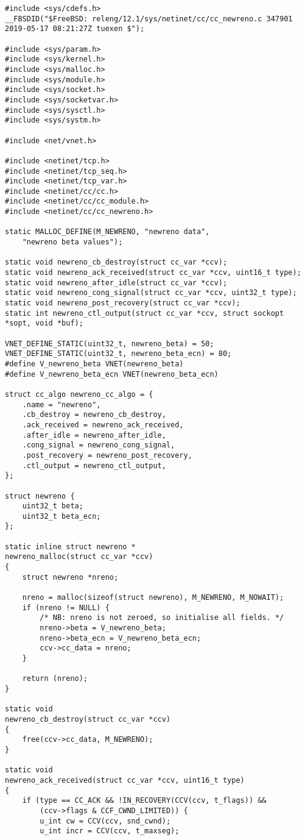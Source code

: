 \begin{code}
\begin{verbatim}
#include <sys/cdefs.h>
__FBSDID("$FreeBSD: releng/12.1/sys/netinet/cc/cc_newreno.c 347901 2019-05-17 08:21:27Z tuexen $");

#include <sys/param.h>
#include <sys/kernel.h>
#include <sys/malloc.h>
#include <sys/module.h>
#include <sys/socket.h>
#include <sys/socketvar.h>
#include <sys/sysctl.h>
#include <sys/systm.h>

#include <net/vnet.h>

#include <netinet/tcp.h>
#include <netinet/tcp_seq.h>
#include <netinet/tcp_var.h>
#include <netinet/cc/cc.h>
#include <netinet/cc/cc_module.h>
#include <netinet/cc/cc_newreno.h>

static MALLOC_DEFINE(M_NEWRENO, "newreno data",
    "newreno beta values");

static void	newreno_cb_destroy(struct cc_var *ccv);
static void	newreno_ack_received(struct cc_var *ccv, uint16_t type);
static void	newreno_after_idle(struct cc_var *ccv);
static void	newreno_cong_signal(struct cc_var *ccv, uint32_t type);
static void	newreno_post_recovery(struct cc_var *ccv);
static int newreno_ctl_output(struct cc_var *ccv, struct sockopt *sopt, void *buf);

VNET_DEFINE_STATIC(uint32_t, newreno_beta) = 50;
VNET_DEFINE_STATIC(uint32_t, newreno_beta_ecn) = 80;
#define V_newreno_beta VNET(newreno_beta)
#define V_newreno_beta_ecn VNET(newreno_beta_ecn)

struct cc_algo newreno_cc_algo = {
    .name = "newreno",
    .cb_destroy = newreno_cb_destroy,
    .ack_received = newreno_ack_received,
    .after_idle = newreno_after_idle,
    .cong_signal = newreno_cong_signal,
    .post_recovery = newreno_post_recovery,
    .ctl_output = newreno_ctl_output,
};

struct newreno {
    uint32_t beta;
    uint32_t beta_ecn;
};

static inline struct newreno *
newreno_malloc(struct cc_var *ccv)
{
    struct newreno *nreno;

    nreno = malloc(sizeof(struct newreno), M_NEWRENO, M_NOWAIT);
    if (nreno != NULL) {
        /* NB: nreno is not zeroed, so initialise all fields. */
        nreno->beta = V_newreno_beta;
        nreno->beta_ecn = V_newreno_beta_ecn;
        ccv->cc_data = nreno;
    }

    return (nreno);
}

static void
newreno_cb_destroy(struct cc_var *ccv)
{
    free(ccv->cc_data, M_NEWRENO);
}

static void
newreno_ack_received(struct cc_var *ccv, uint16_t type)
{
    if (type == CC_ACK && !IN_RECOVERY(CCV(ccv, t_flags)) &&
        (ccv->flags & CCF_CWND_LIMITED)) {
        u_int cw = CCV(ccv, snd_cwnd);
        u_int incr = CCV(ccv, t_maxseg);


\end{verbatim}
\end{code}
